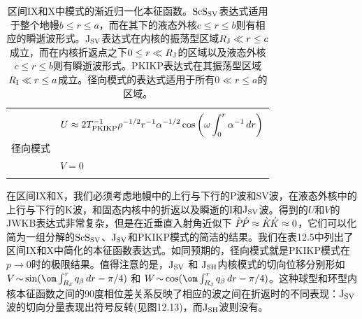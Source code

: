 \begin{table}[!t]
\begin{tabular}{|c|l|}
                  &      \\
& $\displaystyle U\approx 2T_{\rm PKIKP}^{-1}\rho^{-1/2}r^{-1}\alpha^{-1/2}
\cos\left(\omega\int_0^r\alpha^{-1}\,dr\right)$ \\
径向模式 &         \\
& $V=0$ \\
       &         \\ \hline
\end{tabular}
\caption[sphereifs]
{
区间IX和X中模式的渐近归一化本征函数。${\rm ScS}_{\rm SV}$表达式适用于整个地幔$b\leq r\leq a$，而在其下的液态外核$c\leq r\leq b$则有相应的瞬逝波形式。${\rm J}_{\rm SV}$表达式在内核的振荡型区域$R_{\rm J}\ll r\leq c$成立，而在内核折返点之下$0\leq r\ll R_{\rm J}$的区域以及液态外核$c\leq r\leq b$则有瞬逝波形式。PKIKP表达式在其振荡型区域$R_{\rm I}\ll r\leq a$成立。径向模式的表达式适用于所有$0\ll r\leq a$的区域。
}
\label{12.table.UV}
\end{table}
在区间IX和X，我们必须考虑地幔中的上行与下行的P波和SV波，在液态外核中的上行与下行的K波，和固态内核中的折返以及瞬逝的I和${\rm J}_{\rm SV}$波。得到的$U$和$V$的JWKB表达式非常复杂，但是在近垂直入射角近似下
$\grave{P}\hspace{-0.4 mm}\acute{P}\approx
\grave{K}\hspace{-0.4 mm}\acute{K}\approx 0$，它们可以化简为一组分解的${\rm ScS}_{\rm SV}$、${\rm J}_{\rm SV}$和PKIKP模式的简洁的结果。我们在表12.5中列出了区间IX和X中简化的本征函数表达式。如同预期的，径向模式就是PKIKP模式在$p\rightarrow 0$时的极限结果。值得注意的是，${\rm J}_{\rm SV}$ 和
${\rm J}_{\rm SH}$内核模式的切向位移分别形如$V\hspace{-0.6 mm}\sim\hspace{-0.3 mm}
\sin(\om\int_{R_{\rm J}}^rq_{\beta}\,dr-\pi/4)$ 和
$W\hspace{-0.6 mm}\sim\hspace{-0.3 mm}
\cos(\om\int_{R_{\rm J}}^rq_{\beta}\,dr-\pi/4)$。这种球型和环型内核本征函数之间的90度相位差关系反映了相应的波之间在折返时的不同表现：${\rm J}_{\rm SV}$波的切向分量表现出符号反转(见图12.13)，而${\rm J}_{\rm SH}$波则没有。

